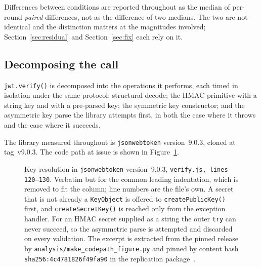 \documentclass[pdflatex,sn-basic,twocolumn]{sn-jnl}%
\newcommand{\LibraryName}{\texttt{jsonwebtoken}}
\newcommand{\LibraryVersion}{version~9.0.3}
\newcommand{\LibraryTag}{tag~v9.0.3}
\newcommand{\CodeFileLines}{verify.js, lines 120--130}
\newcommand{\CodeFirstLine}{120}
\newcommand{\CodeExcerptHash}{sha256:4c4781826f49fa90}
\providecommand{\DIFaddbeginFL}{} %
\providecommand{\DIFaddendFL}{} %
\providecommand{\DIFdelbeginFL}{} %
\providecommand{\DIFdelendFL}{} %
\newcommand{\DIFscaledelfig}{0.5}
\newlength{\DIFdelgraphicswidth} %
\newlength{\DIFdelgraphicsheight} %
\newcommand{\DIFaddincludegraphics}[2][]{{\color{blue}\fbox{\DIFOincludegraphics[#1]{#2}}}} %
\newcommand{\DIFdelincludegraphics}[2][]{%
\sbox{\DIFdelgraphicsbox}{\DIFOincludegraphics[#1]{#2}}%
\settoboxwidth{\DIFdelgraphicswidth}{\DIFdelgraphicsbox} %
\settoboxtotalheight{\DIFdelgraphicsheight}{\DIFdelgraphicsbox} %
\scalebox{\DIFscaledelfig}{%
\parbox[b]{\DIFdelgraphicswidth}{\usebox{\DIFdelgraphicsbox}\\[-\baselineskip] \rule{\DIFdelgraphicswidth}{0em}}\llap{\resizebox{\DIFdelgraphicswidth}{\DIFdelgraphicsheight}{%
\setlength{\unitlength}{\DIFdelgraphicswidth}%
\begin{picture}(1,1)%
\thicklines\linethickness{2pt} %
{\color[rgb]{1,0,0}\put(0,0){\framebox(1,1){}}}%
{\color[rgb]{1,0,0}\put(0,0){\line( 1,1){1}}}%
{\color[rgb]{1,0,0}\put(0,1){\line(1,-1){1}}}%
\end{picture}%
}\hspace*{3pt}}} %
} %
\DeclareRobustCommand{\DIFaddbeginFL}{\DIFOaddbeginFL \let\includegraphics\DIFaddincludegraphics} %
\DeclareRobustCommand{\DIFaddendFL}{\DIFOaddendFL \let\includegraphics\DIFOincludegraphics} %
\DeclareRobustCommand{\DIFdelbeginFL}{\DIFOdelbeginFL \let\includegraphics\DIFdelincludegraphics} %
\DeclareRobustCommand{\DIFdelendFL}{\DIFOaddendFL \let\includegraphics\DIFOincludegraphics} %
\begin{document}
Differences between conditions are reported throughout as the median of
per-round \emph{paired} differences, not as the difference of two medians. The
two are not identical and the distinction matters at the magnitudes involved;
Section~\ref{sec:residual} and Section~\ref{sec:fix} each rely on it.

\subsection{Decomposing the call}\label{sec:decompose}

\texttt{jwt.verify()} is decomposed into the operations it performs, each timed
in isolation under the same protocol: structural decode; the HMAC primitive with
a string key and with a pre-parsed key; the symmetric key constructor; and the
asymmetric key parse the library attempts first, in both the case where it
throws and the case where it succeeds.

The library measured throughout is \LibraryName{} \LibraryVersion{}, cloned at
\LibraryTag. The code path at issue is shown in Figure~\ref{fig:codepath}.

\begin{figure}[t]

\DIFdelbeginFL %
\DIFdelendFL \DIFaddbeginFL \caption{Key resolution in \LibraryName{} \LibraryVersion{},
\texttt{\CodeFileLines}. Verbatim but for the common leading indentation,
which is removed to fit the column; line numbers are the file's own. A secret
that is not already a \texttt{KeyObject} is offered to
\texttt{createPublicKey()} first, and \texttt{createSecretKey()} is reached only
from the exception handler. For an HMAC secret supplied as a string the outer
\texttt{try} can never succeed, so the asymmetric parse is attempted and
discarded on every validation. The excerpt is extracted from the pinned release
by \texttt{analysis/make\_codepath\_figure.py} and pinned by content hash
\texttt{\CodeExcerptHash} in the replication package~\citep{artifact2026}.}
\DIFaddendFL \label{fig:codepath}
\end{figure}
\end{document}
